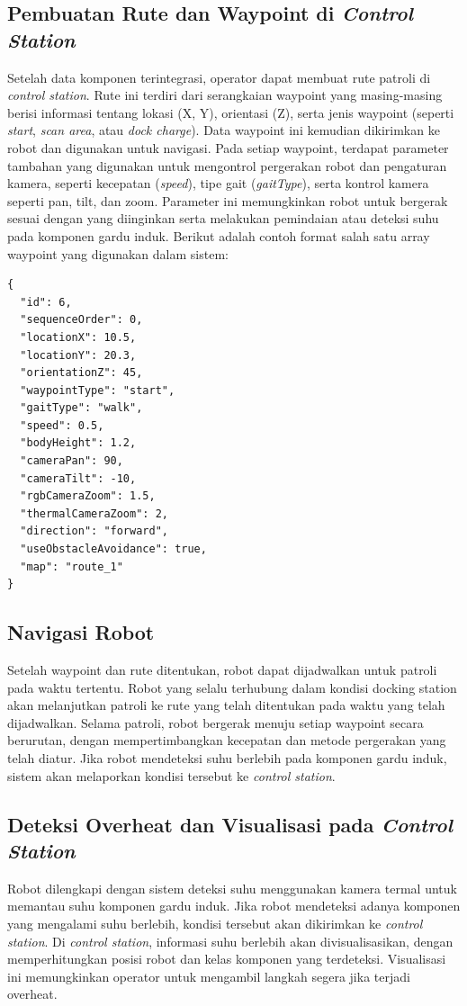 \subsection{Pembuatan Rute dan Waypoint di \emph{Control Station}}
Setelah data komponen terintegrasi, operator dapat membuat rute patroli di \emph{control station}. Rute ini terdiri dari serangkaian waypoint yang masing-masing berisi informasi tentang lokasi (X, Y), orientasi (Z), serta jenis waypoint (seperti \emph{start}, \emph{scan area}, atau \emph{dock charge}). Data waypoint ini kemudian dikirimkan ke robot dan digunakan untuk navigasi. Pada setiap waypoint, terdapat parameter tambahan yang digunakan untuk mengontrol pergerakan robot dan pengaturan kamera, seperti kecepatan (\emph{speed}), tipe gait (\emph{gaitType}), serta kontrol kamera seperti pan, tilt, dan zoom. Parameter ini memungkinkan robot untuk bergerak sesuai dengan yang diinginkan serta melakukan pemindaian atau deteksi suhu pada komponen gardu induk. Berikut adalah contoh format salah satu array waypoint yang digunakan dalam sistem:

\begin{lstlisting}
{
  "id": 6,
  "sequenceOrder": 0,
  "locationX": 10.5,
  "locationY": 20.3,
  "orientationZ": 45,
  "waypointType": "start",
  "gaitType": "walk",
  "speed": 0.5,
  "bodyHeight": 1.2,
  "cameraPan": 90,
  "cameraTilt": -10,
  "rgbCameraZoom": 1.5,
  "thermalCameraZoom": 2,
  "direction": "forward",
  "useObstacleAvoidance": true,
  "map": "route_1"
}
\end{lstlisting}

\subsection{Navigasi Robot}
Setelah waypoint dan rute ditentukan, robot dapat dijadwalkan untuk patroli pada waktu tertentu. Robot yang selalu terhubung dalam kondisi docking station akan melanjutkan patroli ke rute yang telah ditentukan pada waktu yang telah dijadwalkan. Selama patroli, robot bergerak menuju setiap waypoint secara berurutan, dengan mempertimbangkan kecepatan dan metode pergerakan yang telah diatur. Jika robot mendeteksi suhu berlebih pada komponen gardu induk, sistem akan melaporkan kondisi tersebut ke \emph{control station}.

\subsection{Deteksi Overheat dan Visualisasi pada \emph{Control Station}}
Robot dilengkapi dengan sistem deteksi suhu menggunakan kamera termal untuk memantau suhu komponen gardu induk. Jika robot mendeteksi adanya komponen yang mengalami suhu berlebih, kondisi tersebut akan dikirimkan ke \emph{control station}. Di \emph{control station}, informasi suhu berlebih akan divisualisasikan, dengan memperhitungkan posisi robot dan kelas komponen yang terdeteksi. Visualisasi ini memungkinkan operator untuk mengambil langkah segera jika terjadi overheat.

